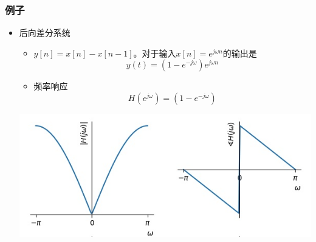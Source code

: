 \documentclass[CJKutf8,xcolor=pdftex,dvipsnames,table]{beamer}
\begin{document}
\begin{CJK*}{UTF8}{song}
\begin{frame}
\begin{itemize}
\begin{itemize}
    	\end{itemize}
    \end{itemize}
  \end{frame}   
  
  \begin{frame}
    \frametitle{例子}
    \begin{itemize}
    \item 后向差分系统
    	\begin{itemize}
		\item $y[n]=x[n]-x[n-1]$。对于输入$x[n]=e^{j\omega n}$的输出是 \[ y(t)=(1-e^{-j\omega}) e^{j\omega n} \]
		\item 频率响应 \[ H(e^{j\omega})=(1-e^{-j\omega}) \]
		\end{itemize}
    \begin{center}
      \includegraphics[scale=.4]{freqrespdiff}
    \end{center}
    \end{itemize}
  \end{frame}  
    

\end{CJK*}
\end{document}

